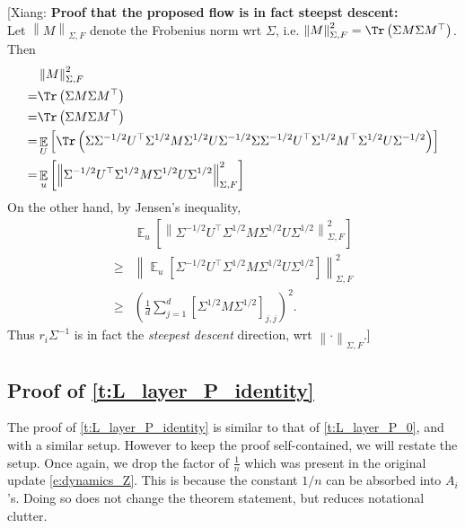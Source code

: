 \documentclass{article}
\DeclareMathOperator{\E}{\mathbb{E}}
\newcommand*\lrb[1]{\left[ #1 \right]}
\newcommand*\lrn[1]{\left\| #1 \right\|}
\newcommand*\lrp[1]{\left( #1 \right)}
\newcommand{\xc}[1]{{\color{black!2!green} [Xiang: #1]}}
\begin{document}
\xc{\textbf{Proof that the proposed flow is in fact steepst descent:}\\
Let $\lrn{M}_{\Sigma, F}$ denote the Frobenius norm wrt $\Sigma$, i.e. $\lrn{M}_{\Sigma, F}^2 = \Tr\lrp{\Sigma M \Sigma M^{\top}}$. Then 
\begin{align*}
& \lrn{M}_{\Sigma, F}^2\\
=& \Tr\lrp{\Sigma M \Sigma M^{\top}}\\
=& \Tr\lrp{\Sigma M \Sigma M^{\top}}\\
=& \E_U\lrb{\Tr\lrp{\Sigma \Sigma^{-1/2} U^\top \Sigma^{1/2} M \Sigma^{1/2} U \Sigma^{-1/2}\Sigma \Sigma^{-1/2} U^\top \Sigma^{1/2} M^{\top} \Sigma^{1/2} U \Sigma^{-1/2}}}\\
=& \E_u \lrb{\lrn{\Sigma^{-1/2} U^\top \Sigma^{1/2} M \Sigma^{1/2} U \Sigma^{1/2}}_{\Sigma, F}^2}
\end{align*}
On the other hand, by Jensen's inequality, 
\begin{align*}
& \E_u \lrb{\lrn{\Sigma^{-1/2} U^\top \Sigma^{1/2} M \Sigma^{1/2} U \Sigma^{1/2}}_{\Sigma, F}^2}\\
\geq& \lrn{\E_u \lrb{\Sigma^{-1/2} U^\top \Sigma^{1/2} M \Sigma^{1/2} U \Sigma^{1/2}}}_{\Sigma, F}^2\\
\geq& \lrp{\frac{1}{d} \sum_{j=1}^d \lrb{\Sigma^{1/2} M \Sigma^{1/2}}_{j,j}}^2.
\end{align*}
Thus $r_i \Sigma^{-1}$ is in fact the \emph{steepest descent} direction, wrt $\lrn{\cdot}_{\Sigma, F}$.}

\fi

\subsection{Proof of \autoref{t:L_layer_P_identity}}
The proof of \autoref{t:L_layer_P_identity} is similar to that of \autoref{t:L_layer_P_0}, and with a similar setup. However to keep the proof self-contained, we will restate the setup. Once again, we drop the factor of $\frac{1}{n}$ which was present in the original update \eqref{e:dynamics_Z}. This is because the constant $1/n$ can be absorbed into $A_i$'s. Doing so does not change the theorem statement, but reduces notational clutter.
\end{document}
